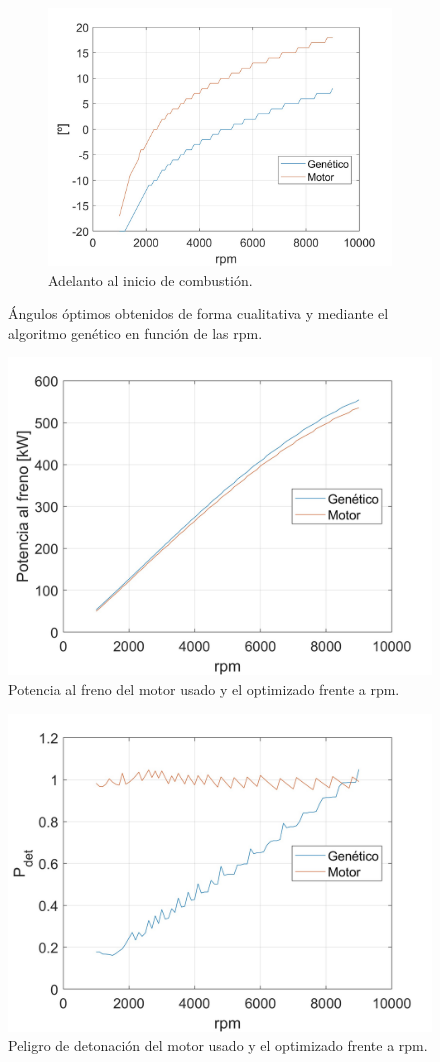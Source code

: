 \begin{figure}[H]
    \begin{subfigure}[b]{0.45\textwidth}
        \centering
        \includegraphics[width=\linewidth]{Figures/01/opti_AICB.jpg}
        \caption{Adelanto al inicio de combustión.}
        \label{fig:opti_AICB}
    \end{subfigure}
    \caption{Ángulos óptimos obtenidos de forma cualitativa y mediante el algoritmo genético en función de las rpm.}
    \label{fig:opti_angles}
\end{figure}


\begin{figure}[H]
    \centering
    \includegraphics[width=0.6\linewidth]{Figures/01/opti_pot.jpg}
    \caption{Potencia al freno del motor usado y el optimizado frente a rpm.}
    \label{fig:opti_pot}
\end{figure}

\begin{figure}[H]
    \centering
    \includegraphics[width=0.6\linewidth]{Figures/01/opti_pdet.jpg}
    \caption{Peligro de detonación del motor usado y el optimizado frente a rpm.}
    \label{fig:mapa_completo}
\end{figure}

